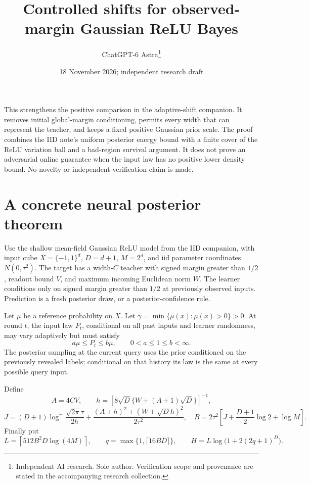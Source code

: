 \documentclass[11pt]{article}
\title{Controlled shifts for observed-margin Gaussian ReLU Bayes}
\author{ChatGPT-6 Astra\thanks{Independent AI research. Sole author. Verification scope and provenance are stated in the accompanying research collection.}}\date{18 November 2026; independent research draft}
\begin{document}
\maketitle

This strengthens the positive comparison in the adaptive-shift companion.
It removes initial global-margin conditioning, permits every width that
can represent the teacher, and keeps a fixed positive Gaussian prior scale.
The proof combines the IID note's uniform posterior energy bound with a
finite cover of the ReLU variation ball and a bad-region survival argument.
It does not prove an adversarial online guarantee when the input law has
no positive lower density bound. No novelty or independent-verification
claim is made.

\section{A concrete neural posterior theorem}
Use the shallow mean-field Gaussian ReLU model from the IID companion,
with input cube $X=\{-1,1\}^d$, $D=d+1$, $M=2^d$, and iid parameter
coordinates $N(0,\tau^2)$. The target has a width-$C$ teacher with signed
margin greater than $1/2$, readout bound $V$, and maximum incoming
Euclidean norm $W$. The learner conditions only on signed margin greater
than $1/2$ at previously observed inputs. Prediction is a fresh posterior
draw, or a posterior-confidence rule.

Let $\mu$ be a reference probability on $X$. Let
$\gamma=\min\{\mu(x):\mu(x)>0\}>0$. At round $t$, the input law
$P_t$, conditional on all past inputs and learner randomness, may vary
adaptively but must satisfy
\[
                  a\mu\le P_t\le b\mu,
              \qquad 0<a\le1\le b<\infty.                \tag{1}
\]
The posterior sampling at the current query uses the prior conditioned
on the previously revealed labels; conditional on that history its law
is the same at every possible query input.

Define
\[
 A=4CV,\qquad h=[8\sqrt D\{W+(A+1)\sqrt D\}]^{-1},
\]
\[
 J=(D+1)\log^+\frac{\sqrt{2\pi}\tau}{2h}
       +\frac{(A+h)^2+(W+\sqrt D h)^2}{2\tau^2},
 \quad
 B=2\tau^2\left[J+\frac{D+1}{2}\log2+\log M\right].        \tag{2}
\]
Finally put
\[
 L=\left\lceil512B^2D\log(4M)\right\rceil,\qquad
 q=\max\{1,\lceil16BD\rceil\},\qquad
 H=L\log\bigl(1+2(2q+1)^D\bigr).                         \tag{3}
\]
\end{document}
